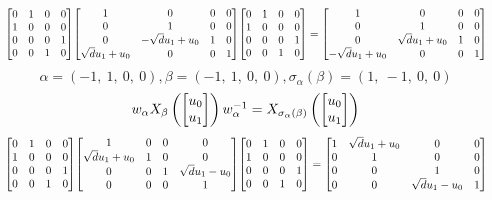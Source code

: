 \documentclass[11pt]{article}
\theoremstyle{definition}
\begin{document}
\[
\scaletoalign{\textwidth}{{\left[\begin{matrix}0 & 1 & 0 & 0\\1 & 0 & 0 & 0\\0 & 0 & 0 & 1\\0 & 0 & 1 & 0\end{matrix}\right]} {\left[\begin{matrix}1 & 0 & 0 & 0\\0 & 1 & 0 & 0\\0 & - \sqrt{d} u_{1} + u_{0} & 1 & 0\\\sqrt{d} u_{1} + u_{0} & 0 & 0 & 1\end{matrix}\right]} {\left[\begin{matrix}0 & 1 & 0 & 0\\1 & 0 & 0 & 0\\0 & 0 & 0 & 1\\0 & 0 & 1 & 0\end{matrix}\right]} = {\left[\begin{matrix}1 & 0 & 0 & 0\\0 & 1 & 0 & 0\\0 & \sqrt{d} u_{1} + u_{0} & 1 & 0\\- \sqrt{d} u_{1} + u_{0} & 0 & 0 & 1\end{matrix}\right]}}
\]
\[
\alpha = \left( -1, \  1, \  0, \  0\right), \beta = \left( -1, \  1, \  0, \  0\right), \sigma_{\alpha}(\beta) = \left( 1, \  -1, \  0, \  0\right)
\]
\[
\scaletoalign{\textwidth}{w_{\alpha} X_{\beta}\left(\left[\begin{matrix}u_{0}\\u_{1}\end{matrix}\right]\right) w_{\alpha}^{-1} = X_{\sigma_{\alpha}\left(\beta\right)}\left(\left[\begin{matrix}u_{0}\\u_{1}\end{matrix}\right]\right)}
\]
\[
\scaletoalign{\textwidth}{{\left[\begin{matrix}0 & 1 & 0 & 0\\1 & 0 & 0 & 0\\0 & 0 & 0 & 1\\0 & 0 & 1 & 0\end{matrix}\right]} {\left[\begin{matrix}1 & 0 & 0 & 0\\\sqrt{d} u_{1} + u_{0} & 1 & 0 & 0\\0 & 0 & 1 & \sqrt{d} u_{1} - u_{0}\\0 & 0 & 0 & 1\end{matrix}\right]} {\left[\begin{matrix}0 & 1 & 0 & 0\\1 & 0 & 0 & 0\\0 & 0 & 0 & 1\\0 & 0 & 1 & 0\end{matrix}\right]} = {\left[\begin{matrix}1 & \sqrt{d} u_{1} + u_{0} & 0 & 0\\0 & 1 & 0 & 0\\0 & 0 & 1 & 0\\0 & 0 & \sqrt{d} u_{1} - u_{0} & 1\end{matrix}\right]}}
\]
\end{document}
